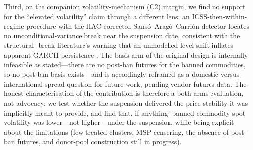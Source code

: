 Third, on the companion volatility-mechanism (C2) margin, we find no support for the
``elevated volatility'' claim through a different lens: an ICSS-then-within-regime
procedure with the HAC-corrected Sans\'{o}--Arag\'{o}--Carri\'{o}n detector locates no
unconditional-variance break near the suspension date, consistent with the structural-
break literature's warning that an unmodelled level shift inflates apparent GARCH
persistence \citep{Hillebrand, Lamoureux1990}. The basis arm of the original design
is internally infeasible as stated---there are no post-ban futures for the banned
commodities, so no post-ban basis exists---and is accordingly reframed as a
domestic-versus-international spread question for future work, pending vendor futures
data. The honest characterisation of the contribution is therefore a both-arms
evaluation, not advocacy: we test whether the suspension delivered the price stability
it was implicitly meant to provide, and find that, if anything, banned-commodity spot
volatility was lower---not higher---under the suspension, while being explicit about
the limitations (few treated clusters, MSP censoring, the absence of post-ban futures,
and donor-pool construction still in progress).
